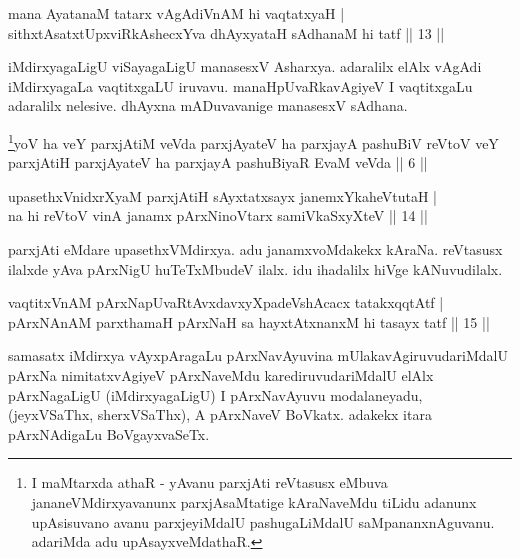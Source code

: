 \begin{shl}
mana AyatanaM tatarx vAgAdiVnAM hi vaqtatxyaH | \\
sithxtAsatxtUpxviRkAshecxYva dhAyxyataH sAdhanaM hi tatf \hfill|| 13 || 
\end{shl}

\begin{artha} 
iMdirxyagaLigU viSayagaLigU manasesxV Asharxya. adaralilx elAlx vAgAdi 
iMdirxyagaLa vaqtitxgaLU iruvavu. manaHpUvaRkavAgiyeV I vaqtitxgaLu 
adaralilx nelesive. dhAyxna mADuvavanige manasesxV sAdhana.
\end{artha}

\begin{kandikeshl}
\footnote{I maMtarxda athaR - yAvanu parxjAti reVtasusx eMbuva 
jananeVMdirxyavanunx parxjAsaMtatige kAraNaveMdu tiLidu adanunx 
upAsisuvano avanu parxjeyiMdalU pashugaLiMdalU saMpananxnAguvanu. 
adariMda adu upAsayxveMdathaR.}yoV ha veY parxjAtiM veVda parxjAyateV ha parxjayA pashuBiV reVtoV veY parxjAtiH parxjAyateV ha parxjayA pashuBiyaR EvaM veVda || 6 ||
\end{kandikeshl}


\begin{shl}
upasethxVnidxrXyaM parxjAtiH sAyxtatxsayx janemxYkaheVtutaH | \\
na hi reVtoV vinA janamx pArxNinoV\s tarx samiVkaSxyXteV \hfill|| 14 || 
\end{shl}

\begin{artha} 
parxjAti eMdare upasethxVMdirxya. adu janamxvoMdakekx kAraNa. reVtasusx ilalxde yAva pArxNigU huTeTxMbudeV ilalx. idu ihadalilx hiVge kANuvudilalx.
\end{artha}


\begin{shl}
vaqtitxVnAM pArxNapUvaRtAvxdavxyXpadeVshAcacx tatakxqqtAtf | \\
pArxNAnAM parxthamaH pArxNaH sa hayxtAtx\s nanxM hi tasayx tatf \hfill|| 15 || 
\end{shl}

\begin{artha}
samasatx iMdirxya vAyxpAragaLu pArxNavAyuvina mUlakavAgiruvudariMdalU pArxNa nimitatxvAgiyeV pArxNaveMdu karediruvudariMdalU elAlx pArxNagaLigU (iMdirxyagaLigU) I pArxNavAyuvu modalaneyadu, (jeyxVSaThx, sherxVSaThx), A pArxNaveV BoVkatx. adakekx itara pArxNAdigaLu BoVgayxvaSeTx.
\end{artha}

